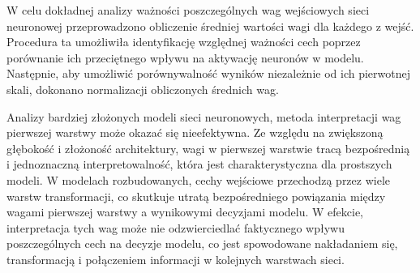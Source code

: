 \documentclass[a4paper,twoside,12pt]{book}
\begin{document}
W celu dokładnej analizy ważności poszczególnych wag wejściowych sieci neuronowej przeprowadzono obliczenie średniej wartości wagi dla każdego z wejść. Procedura ta umożliwiła identyfikację względnej ważności cech poprzez porównanie ich przeciętnego wpływu na aktywację neuronów w modelu. Następnie, aby umożliwić porównywalność wyników niezależnie od ich pierwotnej skali, dokonano normalizacji obliczonych średnich wag.
\begin{table}[!h]
	\centering
	\caption{Todo}
\end{table}
\newpage
Analizy bardziej złożonych modeli sieci neuronowych, metoda interpretacji wag pierwszej warstwy może okazać się nieefektywna. Ze względu na zwiększoną głębokość i złożoność architektury, wagi w pierwszej warstwie tracą bezpośrednią i jednoznaczną interpretowalność, która jest charakterystyczna dla prostszych modeli. W modelach rozbudowanych, cechy wejściowe przechodzą przez wiele warstw transformacji, co skutkuje utratą bezpośredniego powiązania między wagami pierwszej warstwy a wynikowymi decyzjami modelu. W efekcie, interpretacja tych wag może nie odzwierciedlać faktycznego wpływu poszczególnych cech na decyzje modelu, co jest spowodowane nakładaniem się, transformacją i połączeniem informacji w kolejnych warstwach sieci.
\end{document}

